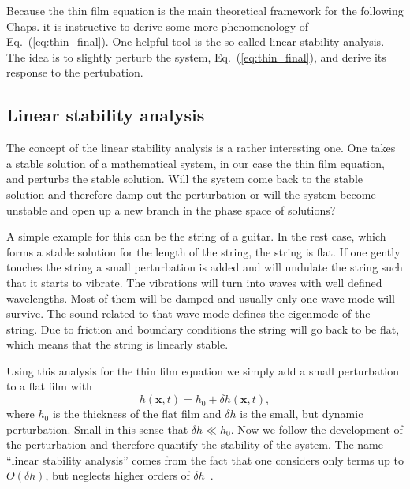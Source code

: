 Because the thin film equation is the main theoretical framework for the following Chaps. it is instructive to derive some more phenomenology of Eq.~(\ref{eq:thin_final}).
One helpful tool is the so called linear stability analysis. 
The idea is to slightly perturb the system, Eq.~(\ref{eq:thin_final}), and derive its response to the pertubation.

\subsection{Linear stability analysis}
\label{susbsec:Lin_stab}
The concept of the linear stability analysis is a rather interesting one.
One takes a stable solution of a mathematical system, in our case the thin film equation, and perturbs the stable solution.
Will the system come back to the stable solution and therefore damp out the perturbation or will the system become unstable and open up a new branch in the phase space of solutions?

A simple example for this can be the string of a guitar.
In the rest case, which forms a stable solution for the length of the string, the string is flat.
If one gently touches the string a small perturbation is added and will undulate the string such that it starts to vibrate.
The vibrations will turn into waves with well defined wavelengths. 
Most of them will be damped and usually only one wave mode will survive.
The sound related to that wave mode defines the eigenmode of the string.
Due to friction and boundary conditions the string will go back to be flat, which means that the string is linearly stable.

Using this analysis for the thin film equation we simply add a small perturbation to a flat film with
\begin{equation}\label{eq:lin_stab_delta}
    h(\mathbf{x},t) = h_0 + \delta h(\mathbf{x},t),
\end{equation}
where $h_0$ is the thickness of the flat film and $\delta h$ is the small, but dynamic perturbation.
Small in this sense that $\delta h \ll h_0$.
Now we follow the development of the perturbation and therefore quantify the stability of the system.
The name ``linear stability analysis'' comes from the fact that one considers only terms up to $O(\delta h)$, but neglects higher orders of $\delta h$~\cite{laugesenLinearStabilitySteady2000}.

